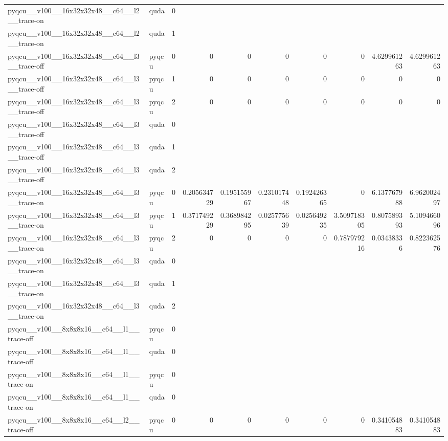 \begin{table}[htbp]
\begin{tabular}{@{}llrrrrrrrr@{}}
pyqcu\_\_v100\_\_16x32x32x48\_\_c64\_\_l2\_\_trace-on & quda & 0 &  &  &  &  &  &  &  \\
pyqcu\_\_v100\_\_16x32x32x48\_\_c64\_\_l2\_\_trace-on & quda & 1 &  &  &  &  &  &  &  \\
pyqcu\_\_v100\_\_16x32x32x48\_\_c64\_\_l3\_\_trace-off & pyqcu & 0 & 0 & 0 & 0 & 0 & 0 & 4.629961263 & 4.629961263 \\
pyqcu\_\_v100\_\_16x32x32x48\_\_c64\_\_l3\_\_trace-off & pyqcu & 1 & 0 & 0 & 0 & 0 & 0 & 0 & 0 \\
pyqcu\_\_v100\_\_16x32x32x48\_\_c64\_\_l3\_\_trace-off & pyqcu & 2 & 0 & 0 & 0 & 0 & 0 & 0 & 0 \\
pyqcu\_\_v100\_\_16x32x32x48\_\_c64\_\_l3\_\_trace-off & quda & 0 &  &  &  &  &  &  &  \\
pyqcu\_\_v100\_\_16x32x32x48\_\_c64\_\_l3\_\_trace-off & quda & 1 &  &  &  &  &  &  &  \\
pyqcu\_\_v100\_\_16x32x32x48\_\_c64\_\_l3\_\_trace-off & quda & 2 &  &  &  &  &  &  &  \\
pyqcu\_\_v100\_\_16x32x32x48\_\_c64\_\_l3\_\_trace-on & pyqcu & 0 & 0.205634729 & 0.195155967 & 0.231017448 & 0.192426365 & 0 & 6.137767988 & 6.962002497 \\
pyqcu\_\_v100\_\_16x32x32x48\_\_c64\_\_l3\_\_trace-on & pyqcu & 1 & 0.371749229 & 0.368984295 & 0.025775639 & 0.025649235 & 3.509718305 & 0.807589393 & 5.109466096 \\
pyqcu\_\_v100\_\_16x32x32x48\_\_c64\_\_l3\_\_trace-on & pyqcu & 2 & 0 & 0 & 0 & 0 & 0.787979216 & 0.03438336 & 0.822362576 \\
pyqcu\_\_v100\_\_16x32x32x48\_\_c64\_\_l3\_\_trace-on & quda & 0 &  &  &  &  &  &  &  \\
pyqcu\_\_v100\_\_16x32x32x48\_\_c64\_\_l3\_\_trace-on & quda & 1 &  &  &  &  &  &  &  \\
pyqcu\_\_v100\_\_16x32x32x48\_\_c64\_\_l3\_\_trace-on & quda & 2 &  &  &  &  &  &  &  \\
pyqcu\_\_v100\_\_8x8x8x16\_\_c64\_\_l1\_\_trace-off & pyqcu & 0 &  &  &  &  &  &  &  \\
pyqcu\_\_v100\_\_8x8x8x16\_\_c64\_\_l1\_\_trace-off & quda & 0 &  &  &  &  &  &  &  \\
pyqcu\_\_v100\_\_8x8x8x16\_\_c64\_\_l1\_\_trace-on & pyqcu & 0 &  &  &  &  &  &  &  \\
pyqcu\_\_v100\_\_8x8x8x16\_\_c64\_\_l1\_\_trace-on & quda & 0 &  &  &  &  &  &  &  \\
pyqcu\_\_v100\_\_8x8x8x16\_\_c64\_\_l2\_\_trace-off & pyqcu & 0 & 0 & 0 & 0 & 0 & 0 & 0.341054883 & 0.341054883 \\

\end{tabular}
\end{table}
